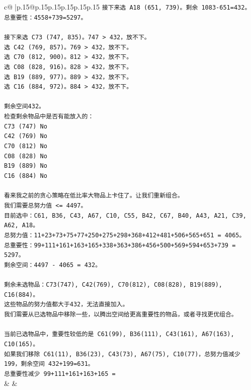 \documentclass{article}
\begin{document}
{\begin{supertabular}{c@{$\;$}|p{.15\linewidth}@{}p{.15\linewidth}p{.15\linewidth}p{.15\linewidth}p{.15\linewidth}p{.15\linewidth}}
{{{\texttt{接下来选 A18 (651, 739)。剩余 1083{-}651=432。} \\
\texttt{总重要性：4558+739=5297。} \\
\\ 
\texttt{接下来选 C73 (747, 835)。747 > 432，放不下。} \\
\texttt{选 C42 (769, 857)。769 > 432，放不下。} \\
\texttt{选 C70 (812, 900)。812 > 432，放不下。} \\
\texttt{选 C08 (828, 916)。828 > 432，放不下。} \\
\texttt{选 B19 (889, 977)。889 > 432，放不下。} \\
\texttt{选 C16 (884, 972)。884 > 432，放不下。} \\
\\ 
\texttt{剩余空间432。} \\
\texttt{检查剩余物品中是否有能放入的：} \\
\texttt{C73 (747) No} \\
\texttt{C42 (769) No} \\
\texttt{C70 (812) No} \\
\texttt{C08 (828) No} \\
\texttt{B19 (889) No} \\
\texttt{C16 (884) No} \\
\\ 
\texttt{看来我之前的贪心策略在低比率大物品上卡住了。让我们重新组合。} \\
\texttt{我们需要总努力值 <= 4497。} \\
\texttt{目前选中：C61, B36, C43, A67, C10, C55, B42, C67, B40, A43, A21, C39, A62, A18。} \\
\texttt{总努力值：11+23+73+75+77+250+275+298+368+412+481+506+565+651 = 4065。} \\
\texttt{总重要性：99+111+161+163+165+338+363+386+456+500+569+594+653+739 = 5297。} \\
\texttt{剩余空间：4497 {-} 4065 = 432。} \\
\\ 
\texttt{剩余未选物品：C73(747), C42(769), C70(812), C08(828), B19(889), C16(884)。} \\
\texttt{这些物品的努力值都大于432，无法直接加入。} \\
\texttt{我们需要从已选物品中移除一些，以腾出空间给更高重要性的物品，或者寻找更优组合。} \\
\\ 
\texttt{当前已选物品中，重要性较低的是 C61(99), B36(111), C43(161), A67(163), C10(165)。} \\
\texttt{如果我们移除 C61(11), B36(23), C43(73), A67(75), C10(77)，总努力值减少 199，剩余空间 432+199=631。} \\
\texttt{总重要性减少 99+111+161+163+165 =} \\
            }
        }
    }
    & & \\ \\


\end{supertabular}}
\end{document}
